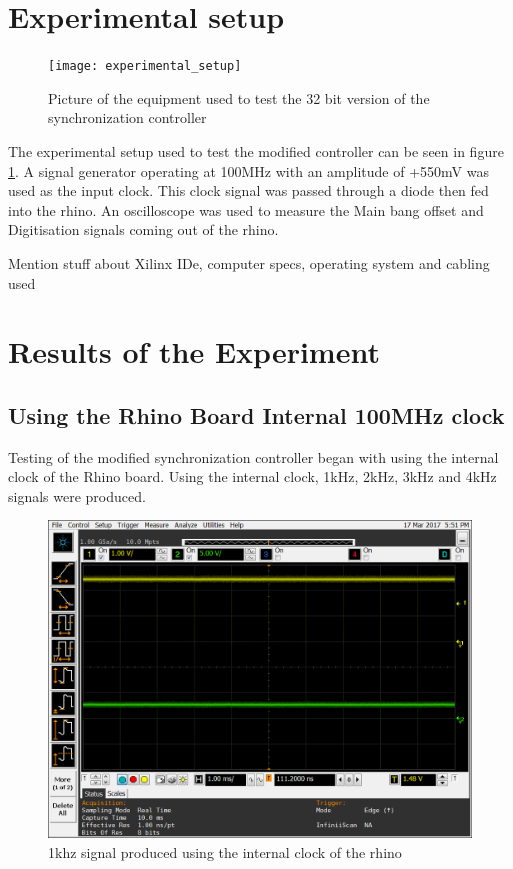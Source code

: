 \documentclass[12pt, a4paper]{article}
\begin{document}
\section{Experimental setup}

	\begin{figure}[h]
		\centering
		\texttt{[image: experimental\_setup]}
		\caption{Picture of the equipment used to test the 32 bit version of the synchronization controller}
		\label{fig:exp_setup}
	\end{figure}
	
The experimental setup used to test the modified controller can be seen in figure \ref{fig:exp_setup}. A signal generator operating at 100MHz with an amplitude of +550mV was used as the input clock. This clock signal was passed through a diode then fed into the rhino. An oscilloscope was used to measure the Main bang offset and Digitisation signals coming out of the rhino. 

\begin{flushleft}
Mention stuff about Xilinx IDe, computer specs, operating system and cabling used
\end{flushleft}
	
	
\section{Results of the Experiment}

\subsection{Using the Rhino Board Internal 100MHz clock}

Testing of the modified synchronization controller began with using the internal clock of the Rhino board. Using the internal clock, 1kHz, 2kHz, 3kHz and 4kHz signals were produced. 

	\begin{figure}
		\centering
		\includegraphics[width=13cm]{1khz_mb_offset_500_ns}
		\caption{1khz signal produced using the internal clock of the rhino}
		\label{fig:1khz_in_500_offset}
	\end{figure}
	
\end{document}
